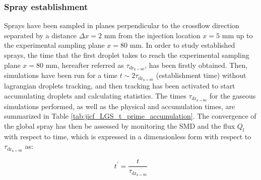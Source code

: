 \subsubsection*{Spray establishment}


Sprays have been sampled in planes perpendicular to the crossflow direction separated by a distance $\Delta x = 2$ mm from the injection location $x = 5$ mm up to the experimental sampling plane $x = 80$ mm. In order to study established sprays, the time that the first droplet takes to reach the experimental sampling plane $x = 80$ mm, hereafter referred as $\tau_\mathrm{dr_{x=80}}$, has been firstly obtained. Then, simulations have been run for a time $t \sim 2 \tau_\mathrm{dr_{x=80}}$ (establishment time) without lagrangian droplets tracking, and then tracking has been activated to start accumulating droplets and calculating statistics. The times $\tau_\mathrm{dr_{x=80}}$ for the gaseous simulations performed, as well as the physical and accumulation times, are summarized in Table \ref{tab:jicf_LGS_t_prime_accumulation}. The convergence of the global spray has then be assessed by monitoring the SMD and the flux $Q_l$ with respect to time, which is expressed in a dimensionless form with respect to $\tau_\mathrm{dr_{x=80}}$ as:

\begin{equation}
\label{eq:t_prime_with_tau_drx80}
t^{\prime} = \frac{t}{\tau_\mathrm{dr_{x=80}}}
\end{equation}



